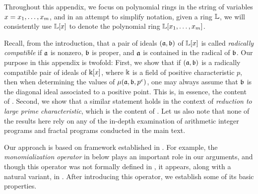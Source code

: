 \documentclass{amsart}
\begin{document}
Throughout this appendix, we focus on polynomial rings in the string of variables $x = x_1, \ldots, x_m$, and in an attempt to simplify notation,  given a ring $\mathbb{L}$, we will {consistently} use $\mathbb{L}[x]$ to denote the polynomial ring $\mathbb{L}[x_1, \ldots, x_m]$.

Recall, from {the introduction}, that a pair of ideals $(\mathfrak{a}, \mathfrak{b})$ of $\mathbb{L}[x]$ is called \emph{radically compatible}
if $\mathfrak{a}$ is nonzero, $\mathfrak{b}$ is proper, and $\mathfrak{a}$ is contained in the radical of $\mathfrak{b}$.  
Our purpose in this appendix is twofold:  First, we show that if $(\mathfrak{a}, \mathfrak{b})$ is a radically compatible pair of ideals of $\Bbbk[x]$, where $\Bbbk$ is a field of positive characteristic $p$, then when determining the values of $\mu(\mathfrak{a}, \mathfrak{b}, p^e)$, one may always assume that $\mathfrak{b}$ is the diagonal ideal associated to a positive point.   This is, in essence, the content of .  Second, we show that a similar statement holds in the context of \emph{reduction to large prime characteristic}, which is the content of .
Let us also note that none of the results here rely on any of the in-depth examination of arithmetic integer programs and fractal programs conducted in the main text. 

Our approach is based on framework established in \cite[Appendix]{budur+mustata+saito.roots_bs_polys_monomial}.  For example, the \emph{monomialization operator} in  below plays an important role in our arguments, and though this operator was not formally defined in \loccit, it appears, along with a natural variant, in \cite[Proposition 6.1 and Lemma 6.2]{budur+mustata+saito.roots_bs_polys_monomial}.  After introducing this operator, we establish some of its basic properties.
\end{document}
